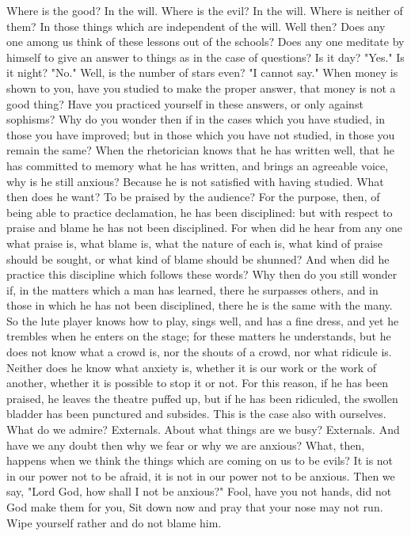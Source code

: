 \documentclass[a4paper]{article}
\begin{document}
    Where is the good? In the will. Where is the evil? In the will. Where is
neither of them? In those things which are independent of the will. Well then?
Does any one among us think of these lessons out of the schools? Does any one
meditate by himself to give an answer to things as in the case of questions? Is
it day? "Yes." Is it night? "No." Well, is the number of stars even? "I cannot
say." When money is shown to you, have you studied to make the proper answer,
that money is not a good thing? Have you practiced yourself in these answers,
or only against sophisms? Why do you wonder then if in the cases which you have
studied, in those you have improved; but in those which you have not studied,
in those you remain the same? When the rhetorician knows that he has written
well, that he has committed to memory what he has written, and brings an
agreeable voice, why is he still anxious? Because he is not satisfied with
having studied. What then does he want? To be praised by the audience? For the
purpose, then, of being able to practice declamation, he has been disciplined:
but with respect to praise and blame he has not been disciplined. For when did
he hear from any one what praise is, what blame is, what the nature of each is,
what kind of praise should be sought, or what kind of blame should be shunned?
And when did he practice this discipline which follows these words? Why then do
you still wonder if, in the matters which a man has learned, there he surpasses
others, and in those in which he has not been disciplined, there he is the same
with the many. So the lute player knows how to play, sings well, and has a fine
dress, and yet he trembles when he enters on the stage; for these matters he
understands, but he does not know what a crowd is, nor the shouts of a crowd,
nor what ridicule is. Neither does he know what anxiety is, whether it is our
work or the work of another, whether it is possible to stop it or not. For this
reason, if he has been praised, he leaves the theatre puffed up, but if he has
been ridiculed, the swollen bladder has been punctured and subsides.
    This is the case also with ourselves. What do we admire? Externals. About
what things are we busy? Externals. And have we any doubt then why we fear or
why we are anxious? What, then, happens when we think the things which are
coming on us to be evils? It is not in our power not to be afraid, it is not in
our power not to be anxious. Then we say, "Lord God, how shall I not be
anxious?" Fool, have you not hands, did not God make them for you, Sit down now
and pray that your nose may not run. Wipe yourself rather and do not blame him.
\end{document}
